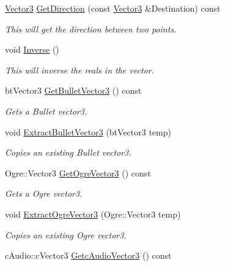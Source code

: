 \begin{DoxyCompactItemize}
\hyperlink{classphys_1_1Vector3}{Vector3} \hyperlink{classphys_1_1Vector3_a63cd464cdd9ba976ac112fdf8bb620be}{GetDirection} (const \hyperlink{classphys_1_1Vector3}{Vector3} \&Destination) const 
\begin{DoxyCompactList}\small\item\em This will get the direction between two points. \item\end{DoxyCompactList}\item 
void \hyperlink{classphys_1_1Vector3_a30af9c8ae51596fa00fa7f350f9668f5}{Inverse} ()
\begin{DoxyCompactList}\small\item\em This will inverse the reals in the vector. \item\end{DoxyCompactList}\item 
btVector3 \hyperlink{classphys_1_1Vector3_adf4129007ee41f5a03e97502f2df9c41}{GetBulletVector3} () const 
\begin{DoxyCompactList}\small\item\em Gets a Bullet vector3. \item\end{DoxyCompactList}\item 
void \hyperlink{classphys_1_1Vector3_a24ae86b068340be6727877f8c6c1a313}{ExtractBulletVector3} (btVector3 temp)
\begin{DoxyCompactList}\small\item\em Copies an existing Bullet vector3. \item\end{DoxyCompactList}\item 
Ogre::Vector3 \hyperlink{classphys_1_1Vector3_a17265d86a74139398d310b56ba7e89b8}{GetOgreVector3} () const 
\begin{DoxyCompactList}\small\item\em Gets a Ogre vector3. \item\end{DoxyCompactList}\item 
void \hyperlink{classphys_1_1Vector3_a09a31cb8fe491f61e0cc10d21705a0df}{ExtractOgreVector3} (Ogre::Vector3 temp)
\begin{DoxyCompactList}\small\item\em Copies an existing Ogre vector3. \item\end{DoxyCompactList}\item 
cAudio::cVector3 \hyperlink{classphys_1_1Vector3_a58b1ac39dfee4c360c16944a7e7f657d}{GetcAudioVector3} () const 

\end{DoxyCompactItemize}
